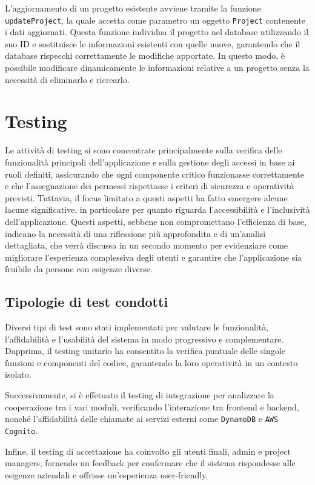 \documentclass[target=bach,aauheader=,style=]{thud}
\begin{document}
\noindent L'aggiornamento di un progetto esistente avviene tramite la funzione \texttt{updateProject}, la quale accetta come parametro un oggetto \texttt{Project} contenente i dati aggiornati. Questa funzione individua il progetto nel database utilizzando il suo ID e sostituisce le informazioni esistenti con quelle nuove, garantendo che il database rispecchi correttamente le modifiche apportate. In questo modo, è possibile modificare dinamicamente le informazioni relative a un progetto senza la necessità di eliminarlo e ricrearlo.



\chapter{Testing}
Le attività di testing si sono concentrate principalmente sulla verifica delle funzionalità principali dell'applicazione e sulla gestione degli accessi in base ai ruoli definiti, assicurando che ogni componente critico funzionasse correttamente e che l'assegnazione dei permessi rispettasse i criteri di sicurezza e operatività previsti. Tuttavia, il focus limitato a questi aspetti ha fatto emergere alcune lacune significative, in particolare per quanto riguarda l'accessibilità e l'inclusività dell'applicazione. Questi aspetti, sebbene non compromettano l'efficienza di base, indicano la necessità di una riflessione più approfondita e di un'analisi dettagliata, che verrà discussa in un secondo momento per evidenziare come migliorare l'esperienza complessiva degli utenti e garantire che l'applicazione sia fruibile da persone con esigenze diverse.

\section{Tipologie di test condotti}
Diversi tipi di test sono stati implementati per valutare le funzionalità, l'affidabilità e l'usabilità del sistema in modo progressivo e complementare. Dapprima, il testing unitario ha consentito la verifica puntuale delle singole funzioni e componenti del codice, garantendo la loro operatività in un contesto isolato. 

\noindent Successivamente, si è effetuato il testing di integrazione per analizzare la cooperazione tra i vari moduli, verificando l'interazione tra frontend e backend, nonché l'affidabilità delle chiamate ai servizi esterni come \texttt{DynamoDB} e \texttt{AWS Cognito}. 

\noindent Infine, il testing di accettazione ha coinvolto gli utenti finali, admin e project managers, fornendo un feedback per confermare che il sistema rispondesse alle esigenze aziendali e offrisse un'esperienza user-friendly.
\end{document}
